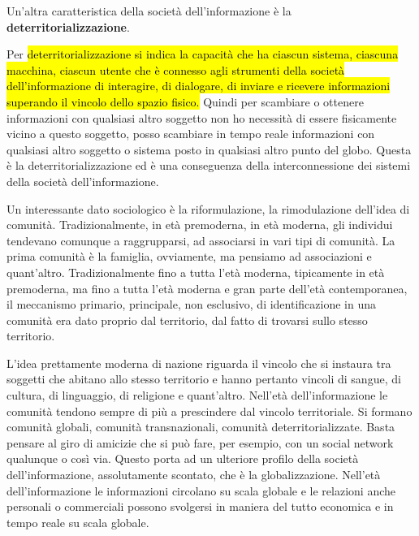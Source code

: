 Un'altra caratteristica della società dell'informazione è la \textbf{deterritorializzazione}.\par 
Per \hl{deterritorializzazione si indica la capacità che ha ciascun sistema, ciascuna macchina, ciascun utente che è connesso agli strumenti della società dell'informazione di interagire, di dialogare, di inviare e ricevere informazioni superando il vincolo dello spazio fisico.} 
Quindi per scambiare o ottenere informazioni con qualsiasi altro soggetto non ho necessità di essere fisicamente vicino a questo soggetto, posso scambiare in tempo reale informazioni con qualsiasi altro soggetto o sistema posto in qualsiasi altro punto del globo. Questa è la deterritorializzazione ed è una conseguenza della interconnessione dei sistemi della società dell'informazione.\par 
Un interessante dato sociologico è la riformulazione, la rimodulazione dell'idea di comunità. Tradizionalmente, in età premoderna, in età moderna, gli individui tendevano comunque a raggrupparsi, ad associarsi in vari tipi di comunità. La prima comunità è la famiglia, ovviamente, ma pensiamo ad associazioni e quant'altro. Tradizionalmente fino a tutta l'età moderna, tipicamente in età premoderna, ma fino a tutta l'età moderna e gran parte dell'età contemporanea, il meccanismo primario, principale, non esclusivo, di identificazione in una comunità era dato proprio dal territorio, dal fatto di trovarsi sullo stesso territorio. 

L'idea prettamente moderna di nazione riguarda il vincolo che si instaura tra soggetti che abitano allo stesso territorio e hanno pertanto vincoli di sangue, di cultura, di linguaggio, di religione e quant'altro. Nell'età dell'informazione le comunità tendono sempre di più a prescindere dal vincolo territoriale. Si formano comunità globali, comunità transnazionali, comunità deterritorializzate. Basta pensare al giro di amicizie che si può fare, per esempio, con un social network qualunque o così via. Questo porta ad un ulteriore profilo della società dell'informazione, assolutamente scontato, che è la globalizzazione. Nell'età dell'informazione le informazioni circolano su scala globale e le relazioni anche personali o commerciali possono svolgersi in maniera del tutto economica e in tempo reale su scala globale. 

